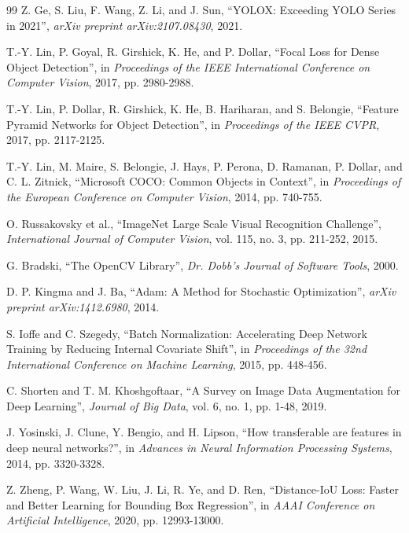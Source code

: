 \documentclass[12pt,a4paper]{report}
\begin{document}
\begin{thebibliography}{99}
    Z. Ge, S. Liu, F. Wang, Z. Li, and J. Sun, ``YOLOX: Exceeding YOLO Series in 2021'', \textit{arXiv preprint arXiv:2107.08430}, 2021.

    T.-Y. Lin, P. Goyal, R. Girshick, K. He, and P. Dollar, ``Focal Loss for Dense Object Detection'', in \textit{Proceedings of the IEEE International Conference on Computer Vision}, 2017, pp. 2980-2988.
    
    T.-Y. Lin, P. Dollar, R. Girshick, K. He, B. Hariharan, and S. Belongie, ``Feature Pyramid Networks for Object Detection'', in \textit{Proceedings of the IEEE CVPR}, 2017, pp. 2117-2125.
    
    T.-Y. Lin, M. Maire, S. Belongie, J. Hays, P. Perona, D. Ramanan, P. Dollar, and C. L. Zitnick, ``Microsoft COCO: Common Objects in Context'', in \textit{Proceedings of the European Conference on Computer Vision}, 2014, pp. 740-755.
    
    O. Russakovsky et al., ``ImageNet Large Scale Visual Recognition Challenge'', \textit{International Journal of Computer Vision}, vol. 115, no. 3, pp. 211-252, 2015.
    
    G. Bradski, ``The OpenCV Library'', \textit{Dr. Dobb's Journal of Software Tools}, 2000.
    
    D. P. Kingma and J. Ba, ``Adam: A Method for Stochastic Optimization'', \textit{arXiv preprint arXiv:1412.6980}, 2014.
    
    S. Ioffe and C. Szegedy, ``Batch Normalization: Accelerating Deep Network Training by Reducing Internal Covariate Shift'', in \textit{Proceedings of the 32nd International Conference on Machine Learning}, 2015, pp. 448-456.
    
    C. Shorten and T. M. Khoshgoftaar, ``A Survey on Image Data Augmentation for Deep Learning'', \textit{Journal of Big Data}, vol. 6, no. 1, pp. 1-48, 2019.
    
    J. Yosinski, J. Clune, Y. Bengio, and H. Lipson, ``How transferable are features in deep neural networks?'', in \textit{Advances in Neural Information Processing Systems}, 2014, pp. 3320-3328.
    
    Z. Zheng, P. Wang, W. Liu, J. Li, R. Ye, and D. Ren, ``Distance-IoU Loss: Faster and Better Learning for Bounding Box Regression'', in \textit{AAAI Conference on Artificial Intelligence}, 2020, pp. 12993-13000.


\end{thebibliography}
\end{document}
